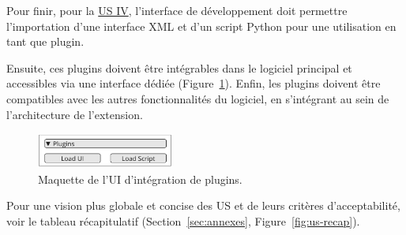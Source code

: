 \documentclass{article}
\begin{document}
{{        \bigskip

        Pour finir, pour la \hyperref[us:plugins]{US IV}, l'interface de développement doit permettre l'importation d'une interface XML et d'un script Python pour une utilisation en tant que plugin.

        Ensuite, ces plugins doivent être intégrables dans le logiciel principal et accessibles via une interface dédiée (Figure~\ref{fig:plugins-ui-mock-up}).
        Enfin, les plugins doivent être compatibles avec les autres fonctionnalités du logiciel, en s'intégrant au sein de l'architecture de l'extension.

        \begin{figure}[!ht]
            \centering
            \includegraphics[width=0.4\textwidth]{images/plugins-ui-mock-up.png}
            \caption{Maquette de l'UI d'intégration de plugins.}
            \label{fig:plugins-ui-mock-up}
        \end{figure}

        \bigskip

        Pour une vision plus globale et concise des US et de leurs critères d'acceptabilité, voir le tableau récapitulatif (Section~\ref{sec:annexes}, Figure~\ref{fig:us-recap}).
    }

    \newpage
}
\end{document}
